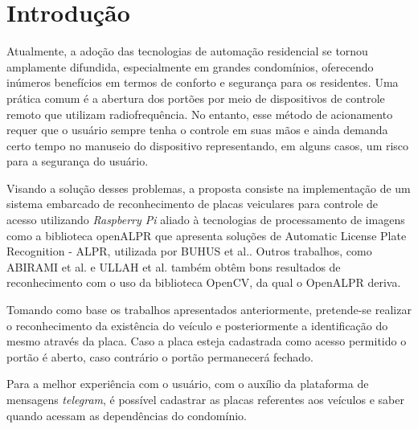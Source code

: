 \documentclass[conference]{IEEEtran}
\begin{document}
\begin{abstract}

\end{abstract}

\begin{IEEEkeywords}

\end{IEEEkeywords}

\section{Introdução}
Atualmente, a adoção das tecnologias de automação residencial se tornou amplamente difundida, especialmente em grandes condomínios, oferecendo inúmeros benefícios em termos de conforto e segurança para os residentes. Uma prática comum é a abertura dos portões por meio de dispositivos de controle remoto que utilizam radiofrequência. No entanto, esse método de acionamento requer que o usuário sempre tenha o controle em suas mãos e ainda demanda certo tempo no manuseio do dispositivo representando, em alguns casos, um risco para a segurança do usuário.

Visando a solução desses problemas, a proposta consiste na implementação de um sistema embarcado de reconhecimento de placas veiculares para controle de acesso utilizando \textit{Raspberry Pi} aliado à tecnologias de processamento de imagens como a biblioteca openALPR que apresenta soluções de Automatic License Plate Recognition - ALPR, utilizada por BUHUS et al.\cite{b1}. Outros trabalhos, como ABIRAMI et al.\cite{b2} e ULLAH et al. \cite{b3} também obtêm bons resultados de reconhecimento com o uso da biblioteca OpenCV, da qual o OpenALPR deriva.

Tomando como base os trabalhos apresentados anteriormente, pretende-se realizar o reconhecimento da existência do veículo e posteriormente a identificação do mesmo através da placa. Caso a placa esteja cadastrada como acesso permitido o portão é aberto, caso contrário o portão permanecerá fechado. 

Para a melhor experiência com o usuário, com o auxílio da plataforma de mensagens \textit{telegram}, é possível cadastrar as placas referentes aos veículos e saber quando acessam as dependências do condomínio.
\end{document}
